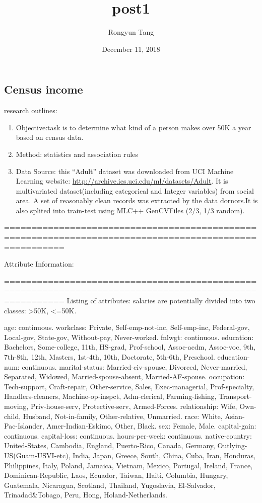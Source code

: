 \documentclass[]{article}
\title{post1}
\author{Rongyun Tang}
\date{December 11, 2018}
\begin{document}
\maketitle

\subsection{Census income}\label{census-income}

research outlines:

\begin{enumerate}
\def\labelenumi{\arabic{enumi}.}
\item
  Objective:task is to determine what kind of a person makes over 50K a
  year based on census data.
\item
  Method: statistics and association rules
\item
  Data Source: this ``Adult'' dataset was downloaded from UCI Machine
  Learning website: \url{http://archive.ics.uci.edu/ml/datasets/Adult}.
  It is multivariated dataset(including categorical and Integer
  variables) from social area. A set of reasonably clean records was
  extracted by the data dornors.It is also splited into train-test using
  MLC++ GenCVFiles (2/3, 1/3 random).
\end{enumerate}

=======================================================================================================

Attribute Information:

=======================================================================================================
Listing of attributes: salaries are potentially divided into two
classes: \textgreater{}50K, \textless{}=50K.

age: continuous. workclass: Private, Self-emp-not-inc, Self-emp-inc,
Federal-gov, Local-gov, State-gov, Without-pay, Never-worked. fnlwgt:
continuous. education: Bachelors, Some-college, 11th, HS-grad,
Prof-school, Assoc-acdm, Assoc-voc, 9th, 7th-8th, 12th, Masters,
1st-4th, 10th, Doctorate, 5th-6th, Preschool. education-num: continuous.
marital-status: Married-civ-spouse, Divorced, Never-married, Separated,
Widowed, Married-spouse-absent, Married-AF-spouse. occupation:
Tech-support, Craft-repair, Other-service, Sales, Exec-managerial,
Prof-specialty, Handlers-cleaners, Machine-op-inspct, Adm-clerical,
Farming-fishing, Transport-moving, Priv-house-serv, Protective-serv,
Armed-Forces. relationship: Wife, Own-child, Husband, Not-in-family,
Other-relative, Unmarried. race: White, Asian-Pac-Islander,
Amer-Indian-Eskimo, Other, Black. sex: Female, Male. capital-gain:
continuous. capital-loss: continuous. hours-per-week: continuous.
native-country: United-States, Cambodia, England, Puerto-Rico, Canada,
Germany, Outlying-US(Guam-USVI-etc), India, Japan, Greece, South, China,
Cuba, Iran, Honduras, Philippines, Italy, Poland, Jamaica, Vietnam,
Mexico, Portugal, Ireland, France, Dominican-Republic, Laos, Ecuador,
Taiwan, Haiti, Columbia, Hungary, Guatemala, Nicaragua, Scotland,
Thailand, Yugoslavia, El-Salvador, Trinadad\&Tobago, Peru, Hong,
Holand-Netherlands.
\end{document}
